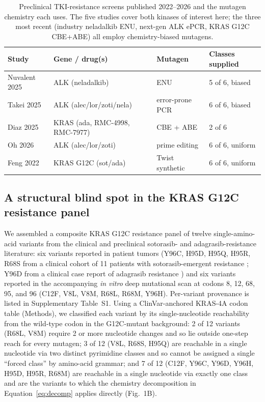 \documentclass[11pt,a4paper]{article}
\begin{document}
\begin{table}[htbp]
\centering
\caption{Preclinical TKI-resistance screens published 2022--2026 and the
mutagen chemistry each uses. The five studies cover both kinases of
interest here; the three most recent (industry neladalkib ENU, next-gen
ALK ePCR, KRAS G12C CBE+ABE) all employ chemistry-biased mutagens.}
\label{tab:current-practice}
\footnotesize
\setlength{\tabcolsep}{4pt}
\begin{tabular*}{\textwidth}{@{\extracolsep{\fill}}llll@{}}
\toprule
\textbf{Study} & \textbf{Gene / drug(s)} & \textbf{Mutagen} & \textbf{Classes supplied} \\
\midrule
Nuvalent 2025 \citep{tangpeerachaikul2025}        & ALK (neladalkib)                 & ENU             & 5 of 6, biased \\
Takei 2025 \citep{takei2025}                      & ALK (alec/lor/zoti/nela)         & error-prone PCR & 6 of 6, biased \\
Diaz 2025 \citep{diaz2025} & KRAS (ada, RMC-4998, RMC-7977)   & CBE + ABE       & 2 of 6         \\
Oh 2026 \citep{oh2026}                            & ALK (alec/lor/zoti)              & prime editing   & 6 of 6, uniform \\
Feng 2022 \citep{feng2022}                        & KRAS G12C (sot/ada)              & Twist synthetic & 6 of 6, uniform \\
\bottomrule
\end{tabular*}
\end{table}

\subsection{A structural blind spot in the KRAS G12C resistance panel}
\label{sec:kras-panel}

We assembled a composite KRAS G12C resistance panel of twelve
single-amino-acid variants from the clinical and preclinical sotorasib-
and adagrasib-resistance literature: six variants reported in patient
tumors (Y96C, H95D, H95Q, H95R, R68S from a clinical cohort of 11
patients with sotorasib-emergent resistance \citep{awad2021}; Y96D from
a clinical case report of adagrasib resistance \citep{tanaka2021}) and
six variants reported in the accompanying \textit{in vitro} deep
mutational scan \citep{awad2021} at codons 8, 12, 68, 95, and 96 (C12F,
V8L, V8M, R68L, R68M, Y96H). Per-variant provenance is listed in
Supplementary Table~S1. Using a ClinVar-anchored KRAS-4A codon table
(Methods), we classified each variant by its single-nucleotide reachability
from the wild-type codon in the G12C-mutant background: 2 of 12 variants
(R68L, V8M) require 2 or more nucleotide changes and so lie outside
one-step reach for every mutagen; 3 of 12 (V8L, R68S, H95Q) are reachable
in a single nucleotide via two distinct pyrimidine classes and so cannot
be assigned a single ``forced class'' by amino-acid grammar; and 7 of 12
(C12F, Y96C, Y96D, Y96H, H95D, H95R, R68M) are reachable in a single
nucleotide via exactly one class and are the variants to which the
chemistry decomposition in Equation~\ref{eq:decomp} applies directly
(Fig.~1B).
\end{document}
